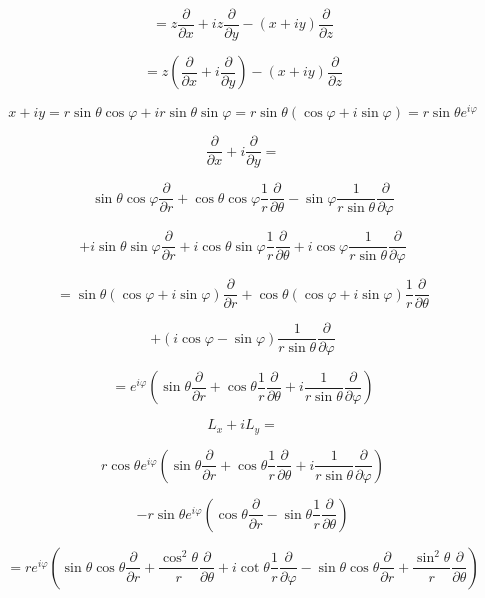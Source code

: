 \documentclass[12pt]{article}
\begin{document}
\[
    = z \frac{\partial}{\partial x} + i z \frac{\partial}{\partial y} - \left(x + i y\right)  \frac{\partial}{\partial z}
\]

\[
    = z \left(\frac{\partial}{\partial x} + i \frac{\partial}{\partial y}\right)  - \left(x + i y\right)  \frac{\partial}{\partial z}
\]

\[
    x+iy = r \sin{\theta} \cos{\varphi} + i r \sin{\theta} \sin{\varphi} = r \sin{\theta} \left(\cos{\varphi} + i \sin{\varphi}\right) = r \sin{\theta} e^{i \varphi}
\]

\[
    \frac{\partial}{\partial x} + i \frac{\partial}{\partial y} =
\]

\[
    \sin{\theta} \cos{\varphi} \frac{\partial}{\partial r} + \cos{\theta} \cos{\varphi} \frac{1}{r} \frac{\partial}{\partial \theta} - \sin{\varphi} \frac{1}{r \sin{\theta}} \frac{\partial}{\partial \varphi}
\]

\[
    + i  \sin{\theta} \sin{\varphi} \frac{\partial}{\partial r} + i \cos{\theta} \sin{\varphi} \frac{1}{r} \frac{\partial}{\partial \theta} + i \cos{\varphi} \frac{1}{r \sin{\theta}} \frac{\partial}{\partial \varphi}
\]

\[
    = \sin{\theta} \left(\cos{\varphi} + i \sin{\varphi}\right) \frac{\partial}{\partial r} + \cos{\theta} \left(\cos{\varphi} + i \sin{\varphi}\right) \frac{1}{r} \frac{\partial}{\partial \theta}
\]

\[
    + \left(i \cos{\varphi} - \sin{\varphi}\right)  \frac{1}{r \sin{\theta}} \frac{\partial}{\partial \varphi}
\]

\[
    = e^{i \varphi} \left(\sin{\theta} \frac{\partial}{\partial r} + \cos{\theta} \frac{1}{r} \frac{\partial}{\partial \theta} + i \frac{1}{r \sin{\theta}} \frac{\partial}{\partial \varphi}\right)
\]

\[
    L_x + i L_y =
\]

\[
    r \cos{\theta} e^{i \varphi} \left(\sin{\theta} \frac{\partial}{\partial r} + \cos{\theta} \frac{1}{r} \frac{\partial}{\partial \theta} + i \frac{1}{r \sin{\theta}} \frac{\partial}{\partial \varphi}\right)
\]

\[
    - r \sin{\theta} e^{i \varphi}  \left(\cos{\theta} \frac{\partial}{\partial r} - \sin{\theta} \frac{1}{r} \frac{\partial}{\partial \theta}\right)
\]

\[
    = r e^{i \varphi} \left(\sin{\theta} \cos{\theta} \frac{\partial}{\partial r} + \frac{\cos^2{\theta}}{r} \frac{\partial}{\partial \theta} + i \cot{\theta} \frac{1}{r}\frac{\partial}{\partial \varphi} - \sin{\theta} \cos{\theta} \frac{\partial}{\partial r} + \frac{\sin^2{\theta}}{r} \frac{\partial}{\partial \theta}\right)
\]
\end{document}
